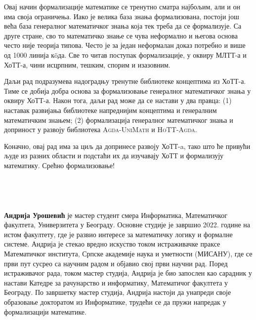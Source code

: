 \documentclass[12pt,oneside]{memoir}
\begin{document}
Овај начин формализације математике се тренутно сматра најбољим, али и он има своја ограничења. Иако је велика база знања формализована, постоји још већа база генералног математичког знања која тек треба да се формализује. Са друге стране, сво то математичко знање се чува неформално и његова основа често није теорија типова. Често је за један неформалан доказ потребно и више од 1000 линија к{\"o}да. Све то читав поступак формализације, у оквиру МЛТТ-а и ХоТТ-а, чини исцрпним, тешким, спорим и изазовним.

Даљи рад подразумева надоградњу тренутне библиотеке концептима из ХоТТ-а. Тиме се добија добра основа за формализовање генералног математичког знања у оквиру ХоТТ-а. Након тога, даљи рад може да се настави у два правца: (1) наставак развијања библиотеке напреднијим концептима и генералним математичким знањем; (2) формализација генералног математичког знања и доприност у развоју библиотека \textsc{Agda-UniMath} и \textsc{HoTT-Agda}.

Коначно, овај рад има за циљ да допринесе развоју ХоТТ-a, тако што ће привући људе из разних области и подстаћи их да изучавају ХоТТ и формализују математику. Срећно формализовање! 

\literatura\

\backmatter\

\begin{biografija}
\textbf{Андрија Урошевић} је мастер студент смера Информатика, Математичког факултета, Универзитета у Београду. Основне студије је завршио 2022. године на истом факултету, где је развио интересе за математичку логику и формалне системе. Андрија је стекао вредно искуство током истраживачке праксе Математичког института, Српске академије наука и уметности (МИСАНУ), где се први пут сусрео са научним радом и објавио свој први научни рад. Поред истраживачог рада, током мастер студија, Андрија је био запослен као сарадник у настави Катедре за рачунарство и информатику, Математичог факултета у Београду. По завршетку мастер студија, Андрија настоји да унапреди своје образовање докторатом из Информатике, трудећи се да пружи напредак у формализацији математике.
\end{biografija}
\end{document}
